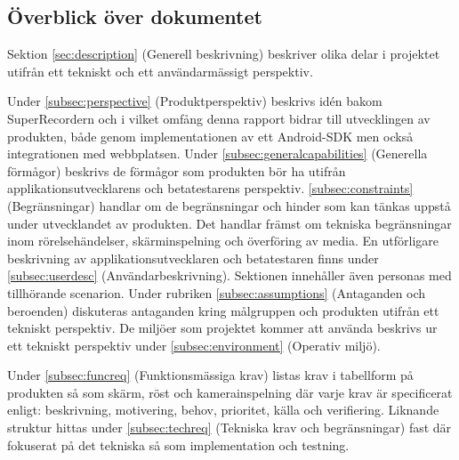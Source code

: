 \subsection{Överblick över dokumentet}

Sektion \ref{sec:description} (Generell beskrivning) beskriver olika delar i projektet utifrån ett tekniskt och ett användarmässigt perspektiv.
 
Under \ref{subsec:perspective} (Produktperspektiv) beskrivs idén bakom SuperRecordern och i vilket omfång denna rapport bidrar till utvecklingen av produkten, både genom implementationen av ett Android-SDK men också integrationen med webbplatsen. Under \ref{subsec:generalcapabilities} (Generella förmågor) beskrivs de förmågor som produkten bör ha utifrån applikationsutvecklarens och betatestarens perspektiv. \ref{subsec:constraints} (Begränsningar) handlar om de begränsningar och hinder som kan tänkas uppstå under utvecklandet av produkten. Det handlar främst om tekniska begränsningar inom rörelsehändelser, skärminspelning och överföring av media. En utförligare beskrivning av applikationsutvecklaren och betatestaren finns under \ref{subsec:userdesc} (Användarbeskrivning). Sektionen innehåller även personas med tillhörande scenarion. Under rubriken \ref{subsec:assumptions} (Antaganden och beroenden) diskuteras antaganden kring målgruppen och produkten utifrån ett tekniskt perspektiv. De miljöer som projektet kommer att använda beskrivs ur ett tekniskt perspektiv under \ref{subsec:environment} (Operativ miljö).

Under \ref{subsec:funcreq} (Funktionsmässiga krav) listas krav i tabellform på produkten så som skärm, röst och kamerainspelning där varje krav är specificerat enligt: beskrivning, motivering, behov, prioritet, källa och verifiering. Liknande struktur hittas under \ref{subsec:techreq} (Tekniska krav och begränsningar) fast där fokuserat på det tekniska så som implementation och testning.